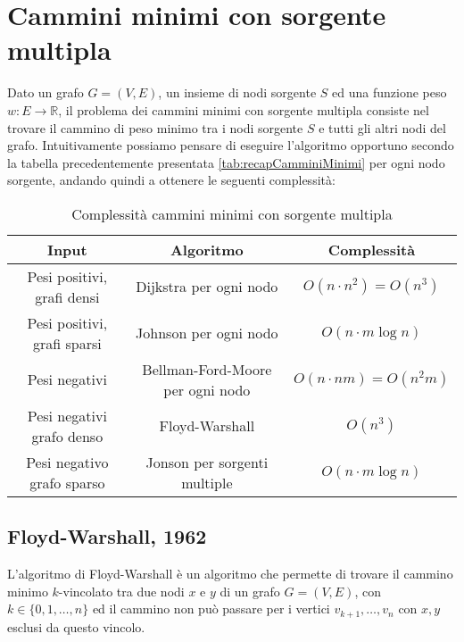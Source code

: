 \section{Cammini minimi con sorgente multipla}
    Dato un grafo $G=(V,E)$, un insieme di nodi sorgente $S$ ed una funzione peso $w: E \rightarrow \mathbb{R}$, il problema dei cammini minimi con sorgente multipla consiste nel trovare il cammino di peso minimo tra i nodi sorgente $S$ e tutti gli altri nodi del grafo.\newline
    Intuitivamente possiamo pensare di eseguire l'algoritmo opportuno secondo la tabella precedentemente presentata \ref{tab:recapCamminiMinimi} per ogni nodo sorgente, andando quindi a ottenere le seguenti complessità:
    \begin{table}[H]
        \centering
        \begin{tabular}{|c|c|c|}
            \hline
            \textbf{Input} & \textbf{Algoritmo} & \textbf{Complessità} \\
            \hline
            Pesi positivi, grafi densi & Dijkstra per ogni nodo & $O(n\cdot n^2)=O(n^3)$ \\
            Pesi positivi, grafi sparsi & Johnson per ogni nodo & $O(n\cdot m\log n)$ \\
            Pesi negativi & Bellman-Ford-Moore per ogni nodo & $O(n\cdot nm)=O(n^2m)$ \\
            Pesi negativi grafo denso & Floyd-Warshall & $O(n^3)$ \\
            Pesi negativo grafo sparso & Jonson per sorgenti multiple & $O(n\cdot m\log n)$ \\
            \hline
        \end{tabular}
        \caption{Complessità cammini minimi con sorgente multipla}
    \end{table} 
    \subsection{Floyd-Warshall, 1962}
        L'algoritmo di Floyd-Warshall è un algoritmo che permette di trovare il cammino minimo $k$-vincolato tra due nodi $x$ e $y$ di un grafo $G=(V,E)$, con $k\in\{0,1,\ldots,n\}$ ed il cammino non può passare per i vertici $v_{k+1},\ldots,v_n$ con $x,y$ esclusi da questo vincolo.
